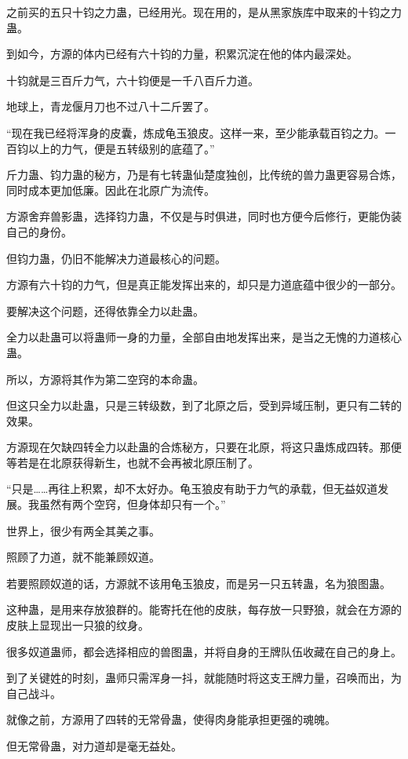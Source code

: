 \begin{this_body}
之前买的五只十钧之力蛊，已经用光。现在用的，是从黑家族库中取来的十钧之力蛊。

到如今，方源的体内已经有六十钧的力量，积累沉淀在他的体内最深处。

十钧就是三百斤力气，六十钧便是一千八百斤力道。

地球上，青龙偃月刀也不过八十二斤罢了。

“现在我已经将浑身的皮囊，炼成龟玉狼皮。这样一来，至少能承载百钧之力。一百钧以上的力气，便是五转级别的底蕴了。”

斤力蛊、钧力蛊的秘方，乃是有七转蛊仙楚度独创，比传统的兽力蛊更容易合炼，同时成本更加低廉。因此在北原广为流传。

方源舍弃兽影蛊，选择钧力蛊，不仅是与时俱进，同时也方便今后修行，更能伪装自己的身份。

但钧力蛊，仍旧不能解决力道最核心的问题。

方源有六十钧的力气，但是真正能发挥出来的，却只是力道底蕴中很少的一部分。

要解决这个问题，还得依靠全力以赴蛊。

全力以赴蛊可以将蛊师一身的力量，全部自由地发挥出来，是当之无愧的力道核心蛊。

所以，方源将其作为第二空窍的本命蛊。

但这只全力以赴蛊，只是三转级数，到了北原之后，受到异域压制，更只有二转的效果。

方源现在欠缺四转全力以赴蛊的合炼秘方，只要在北原，将这只蛊炼成四转。那便等若是在北原获得新生，也就不会再被北原压制了。

“只是……再往上积累，却不太好办。龟玉狼皮有助于力气的承载，但无益奴道发展。我虽然有两个空窍，但身体却只有一个。”

世界上，很少有两全其美之事。

照顾了力道，就不能兼顾奴道。

若要照顾奴道的话，方源就不该用龟玉狼皮，而是另一只五转蛊，名为狼图蛊。

这种蛊，是用来存放狼群的。能寄托在他的皮肤，每存放一只野狼，就会在方源的皮肤上显现出一只狼的纹身。

很多奴道蛊师，都会选择相应的兽图蛊，并将自身的王牌队伍收藏在自己的身上。

到了关键姓的时刻，蛊师只需浑身一抖，就能随时将这支王牌力量，召唤而出，为自己战斗。

就像之前，方源用了四转的无常骨蛊，使得肉身能承担更强的魂魄。

但无常骨蛊，对力道却是毫无益处。


\end{this_body}
